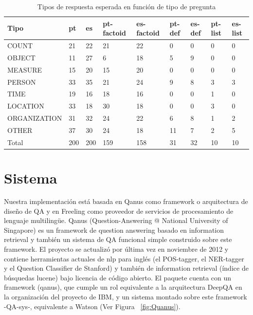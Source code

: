 \begin{center}
\begin{table}[H]
\centering
\begin{tabular}{| l | l | l | l | l | l |l |l|l|}
\hline
Tipo & pt & es & pt-factoid & es-factoid & pt-def & es-def & pt-list & es-list \\ \hline
COUNT & 21 & 22 & 21 & 22 & 0 & 0 & 0  & 0\\ \hline
OBJECT & 11 & 27 & 6  & 18 & 5 & 9 & 0  & 0\\ \hline
MEASURE & 15 & 20 & 15 & 20 & 0 & 0 & 0  & 0\\ \hline
PERSON & 33  & 35 & 21 & 24 & 9 & 8 & 3 & 3\\ \hline
TIME & 19 & 16 & 18 & 16 & 0 & 0 & 1 & 0\\ \hline
LOCATION & 33 & 18  & 30 & 18 & 0 & 0 & 3 & 0 \\ \hline
ORGANIZATION & 31 & 32 & 24 & 22 & 6 & 8 & 1 & 2\\ \hline
OTHER & 37 & 30 & 24 & 18 & 11 & 7 & 2 & 5 \\ \hline
Total & 200 & 200 & 159 & 158 & 31 & 32  & 10 & 10\\ \hline
\end{tabular}
\caption{Tipos de respuesta esperada en función de tipo de pregunta}
\label{table:tipo-general}
\end{table}
\end{center}


\section{Sistema}
\label{sec:sistema}

Nuestra implementación está basada en Qanus como framework o arquitectura de diseño de QA y en Freeling como proveedor de servicios de procesamiento de lenguaje multilingüe. Qanus (Question-Answering @ National University of Singapore) es un framework de question answering basado en information retrieval y también un sistema de QA funcional simple construido sobre este framework. El proyecto se actualizó por última vez en noviembre de 2012 y contiene herramientas actuales de nlp para inglés (el POS-tagger, el NER-tagger y el Question Classifier de Stanford) y también de information retrieval (índice de búsquedas lucene) bajo licencia de código abierto. El paquete cuenta con un framework (qanus), que cumple un rol equivalente a la arquitectura DeepQA en la organización del proyecto de IBM, y un sistema montado sobre este framework -QA-sys-, equivalente a Watson (Ver Figura ~\ref{fig:Quanus}).


